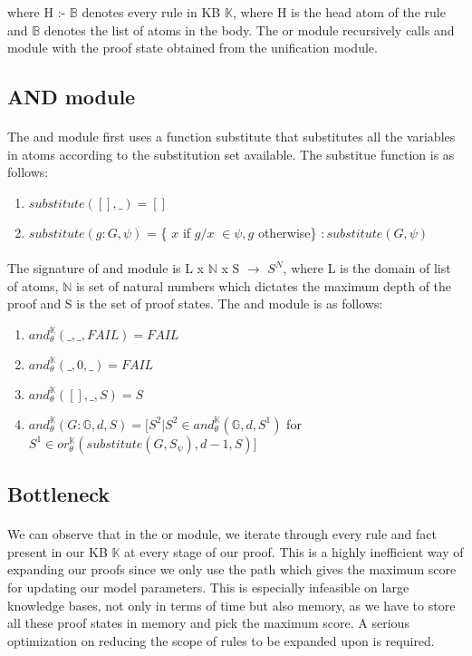 \documentclass[Other]{iitddiss}
\begin{document}
where H :- $\mathbb{B}$ denotes every rule in KB $\mathbb{K}$, where H is the head atom of the rule and $\mathbb{B}$ denotes the list of atoms in the body. The or module recursively calls and module with the proof state obtained from the unification module.

\subsection{AND module}
\paragraph{}
The and module first uses a function substitute that substitutes all the variables in atoms according to the substitution set available. The substitue function is as follows:

\begin{enumerate}
	\item \( substitute([ ], \_) = [ ]\)
	\item \( substitute(g:G, \psi)\) = \{ $x$ if $g/x$ \(\in \psi, g\) otherwise\} \(: substitute(G, \psi)\)
\end{enumerate}

\paragraph{}
The signature of and module is L x $\mathbb{N}$ x S $\rightarrow$ $S^N$, where L is the domain of list of atoms, $\mathbb{N}$ is set of natural numbers which dictates the maximum depth of the proof and S is the set of proof states. The and module is as follows:

\begin{enumerate}
	\item \(and_{\theta}^{\mathbb{K}}(\_, \_, FAIL) = FAIL \)
	\item \(and_{\theta}^{\mathbb{K}}(\_, 0, \_) = FAIL \)
	\item \(and_{\theta}^{\mathbb{K}}([ ], \_, S) = S \)
	\item \(and_{\theta}^{\mathbb{K}}(G:\mathbb{G}, d, S) = [ S^2 | S^2 \in {and_{\theta}^{\mathbb{K}}(\mathbb{G}, d, S^1)}\) for \(S^1 \in {or_{\theta}^{\mathbb{K}}(substitute(G, S_{\psi}), d-1, S)} ] \)
\end{enumerate}

\subsection{Bottleneck}
\paragraph{}
We can observe that in the or module, we iterate through every rule and fact present in our KB $\mathbb{K}$ at every stage of our proof. This is a highly inefficient way of expanding our proofs since we only use the path which gives the maximum score for updating our model parameters. This is especially infeasible on large knowledge bases, not only in terms of time but also memory, as we have to store all these proof states in memory and pick the maximum score. A serious optimization on reducing the scope of rules to be expanded upon is required.
\end{document}
